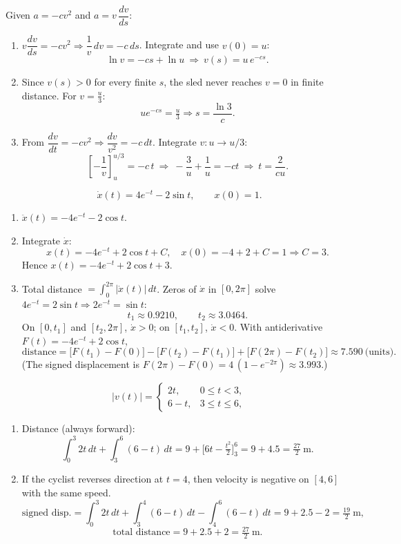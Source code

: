 \documentclass[11pt]{article}
\begin{document}
\begin{solution}
Given \(a=-cv^{2}\) and \(a=v\,\dfrac{dv}{ds}\):
\begin{enumerate}
\item \(v\dfrac{dv}{ds}=-cv^{2}\Rightarrow \dfrac{1}{v}\,dv=-c\,ds\).
Integrate and use \(v(0)=u\):
\[
\ln v = -cs+\ln u\ \Rightarrow\ \boxed{v(s)=u\,e^{-cs}}.
\]
\item Since \(v(s)>0\) for every finite \(s\), the sled never reaches \(v=0\) in
finite distance. For \(v=\tfrac{u}{3}\):
\[
u e^{-cs}=\tfrac{u}{3}\Rightarrow s=\boxed{\dfrac{\ln 3}{c}}.
\]
\item From \( \dfrac{dv}{dt}=-cv^{2}\Rightarrow \dfrac{dv}{v^{2}}=-c\,dt\).
Integrate \(v:u\to u/3\):
\[
\left[-\frac{1}{v}\right]_{u}^{u/3}=-c\,t \ \Rightarrow\ 
-\frac{3}{u}+\frac{1}{u}=-ct \ \Rightarrow\ 
\boxed{t=\dfrac{2}{cu}}.
\]
\end{enumerate}
\end{solution}

\begin{solution}
\[
\dot{x}(t)=4e^{-t}-2\sin t,\qquad x(0)=1.
\]
\begin{enumerate}
\item \(\ddot{x}(t)=-4e^{-t}-2\cos t\).
\item Integrate \(\dot{x}\):
\[
x(t)=-4e^{-t}+2\cos t+C,\quad 
x(0)=-4+2+C=1\Rightarrow C=3.
\]
Hence \(\boxed{x(t)=-4e^{-t}+2\cos t+3}\).
\item Total distance \(=\int_{0}^{2\pi}\!|\dot{x}(t)|\,dt\).
Zeros of \(\dot{x}\) in \([0,2\pi]\) solve \(4e^{-t}=2\sin t\Rightarrow 2e^{-t}=\sin t\):
\[
t_1\approx0.9210,\qquad t_2\approx3.0464.
\]
On \([0,t_1]\) and \([t_2,2\pi]\), \(\dot{x}>0\); on \([t_1,t_2]\), \(\dot{x}<0\).
With antiderivative \(F(t)=-4e^{-t}+2\cos t\),
\[
\text{distance}= \big[F(t_1)-F(0)\big] - \big[F(t_2)-F(t_1)\big] + \big[F(2\pi)-F(t_2)\big]
\approx \boxed{7.590\ \text{(units)}}.
\]
(The signed displacement is \(F(2\pi)-F(0)=4\,(1-e^{-2\pi})\approx3.993\).)
\end{enumerate}
\end{solution}

\begin{solution}
\[
|v(t)|=\begin{cases}
2t,& 0\le t<3,\\[2pt]
6-t,& 3\le t\le 6,
\end{cases}
\]
\begin{enumerate}
\item Distance (always forward):
\[
\int_{0}^{3}2t\,dt+\int_{3}^{6}(6-t)\,dt
=9+\Big[6t-\tfrac{t^{2}}{2}\Big]_{3}^{6}
=9+4.5=\boxed{\tfrac{27}{2}\ \text{m}}.
\]
\item If the cyclist reverses direction at \(t=4\), then velocity is negative on \([4,6]\) with the same speed.
\[
\text{signed disp.}=\int_{0}^{3}\!2t\,dt+\int_{3}^{4}\!(6-t)\,dt-\int_{4}^{6}\!(6-t)\,dt
=9+2.5-2=\boxed{\tfrac{19}{2}\ \text{m}},
\]
\[
\text{total distance}=9+2.5+2=\boxed{\tfrac{27}{2}\ \text{m}}.
\]
\end{enumerate}
\end{solution}
\end{document}
